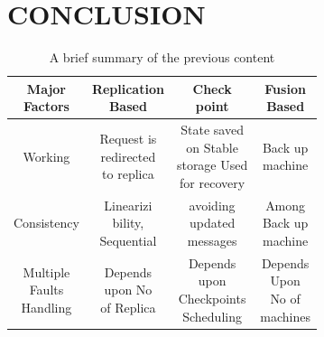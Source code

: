 \documentclass{article}
\begin{document}
\section{CONCLUSION}
\begin{table}[h]
    \centering
    \caption{A brief summary of the previous content}
    \label{t1}
    \begin{tabular}{ | c | c | c | c | }    
        \hline
        \thead{Major\\Factors} & \thead{Replication\\Based} & \thead{Check\\point} &\thead{Fusion\\Based} \\
        \hline
        \small{Working}& \makecell{\small{Request is}\\\small{redirected}\\\small{to replica}}& \makecell{\small{State saved} \\\small{on Stable} \\\small{storage Used}\\\small{for recovery}}&\makecell{\small{Back up}\\\small{machine}} \\
        \hline        \small{Consistency}&\makecell{\small{Linearizi}\\\small{bility,}\\\small{Sequential}}& \makecell{\small{avoiding} \\\small{updated} \\\small{messages}}&\makecell{\small{Among}\\\small{Back up}\\\small{machine}} \\        
        \hline    		\makecell{\small{Multiple}\\\small{Faults}\\\small{Handling}}&\makecell{\small{Depends}\\\small{upon No}\\\small{of Replica}}& \makecell{\small{Depends} \\\small{upon}\\\small{Checkpoints}\\\small{Scheduling}}&\makecell{\small{Depends}\\\small{Upon}\\\small{No of}\\\small{machines}} \\
    	\hline
    \end{tabular}
\end{table}
\end{document}

